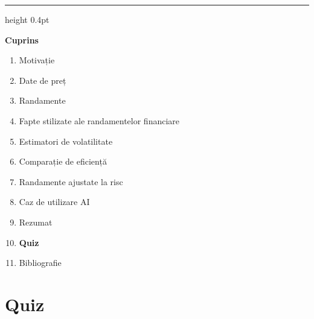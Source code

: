 \documentclass[9pt, aspectratio=169, t]{beamer}
\theoremstyle{definition}
\begin{document}
{
\begin{frame}{}
    {\color{FooterGray}\hrule height 0.4pt}
    \vspace{0.1cm}
    {\Large\textcolor{IDAred}{\textbf{Cuprins}}}
    \vspace{0.2cm}
    \begin{enumerate}
        \item Motivație \checkmark
        \item Date de preț \checkmark
        \item Randamente \checkmark
        \item Fapte stilizate ale randamentelor financiare \checkmark
        \item Estimatori de volatilitate \checkmark
        \item Comparație de eficiență \checkmark
        \item Randamente ajustate la risc \checkmark
        \item Caz de utilizare AI \checkmark
        \item Rezumat \checkmark
        \item \textbf{Quiz}
        \item Bibliografie
    \end{enumerate}
\end{frame}
}

\section{Quiz}
\end{document}

